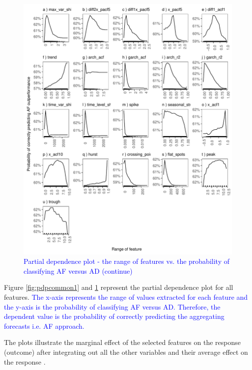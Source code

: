 \documentclass[preprint, 3p,
authoryear]{elsarticle} %
\begin{document}
\begin{figure}[H]

{\centering \includegraphics[width=1\linewidth]{img/300dpi/partial_dependence2} 

}

\caption{ \textcolor{blue}{Partial dependence plot - the range of features vs. the probability of classifying AF versus AD (continue)} }\label{fig:pdpcommon2}
\end{figure}

Figure \ref{fig:pdpcommon1} and \ref{fig:pdpcommon2} represent the
partial dependence plot for all features.
\textcolor{blue}{The x-axis represents the range of values extracted for each feature and the y-axis is the probability of classifying AF versus AD. Therefore, the dependent value is the probability of correctly predicting the aggregating forecasts i.e. AF approach.}

The plots illustrate the marginal effect of the selected features on the
response (outcome) after integrating out all the other variables and
their average effect on the response \citep{james2013introduction}.
\end{document}
